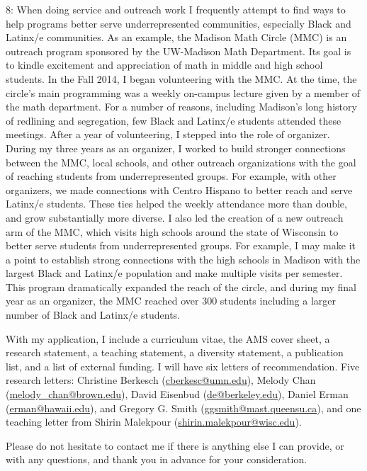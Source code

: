 \documentclass[11pt]{article}
\begin{document}
8: When doing service and outreach work I frequently attempt to find ways to help programs better serve underrepresented communities, especially Black and Latinx/e communities. As an example, the Madison Math Circle (MMC) is an outreach program sponsored by the UW-Madison Math Department. Its goal is to kindle excitement and appreciation of math in middle and high school students. In the Fall 2014, I began volunteering with the MMC. At the time, the circle's main programming was a weekly on-campus lecture given by a member of the math department. For a number of reasons, including Madison's long history of redlining and segregation, few Black and Latinx/e students attended these meetings. After a year of volunteering, I stepped into the role of organizer. During my three years as an organizer, I worked to build stronger connections between the MMC, local schools, and other outreach organizations with the goal of reaching students from underrepresented groups. For example, with other organizers, we made connections with Centro Hispano to better reach and serve Latinx/e students. These ties helped the weekly attendance more than double, and grow substantially more diverse. I also led the creation of a new outreach arm of the MMC, which visits high schools around the state of Wisconsin to better serve students from underrepresented groups. For example, I may make it a point to establish strong connections with the high schools in Madison with the largest Black and Latinx/e population and make multiple visits per semester. This program dramatically expanded the reach of the circle, and during my final year as an organizer, the MMC reached over 300 students including a larger number of Black and Latinx/e students.

With my application, I include a curriculum vitae, the AMS cover sheet, a research statement, a teaching statement, a diversity statement, a publication list, and a list of external funding. I will have six letters of recommendation. Five research letters: Christine Berkesch (\href{mailto:cberkesc@umn.edu}{cberkesc@umn.edu}), Melody Chan (\href{mailto:melody\_chan@brown.edu}{melody\_chan@brown.edu}), David Eisenbud  (\href{mailto:de@berkeley.edu
}{de@berkeley.edu}), Daniel Erman (\href{mailto:erman@hawaii.edu}{erman@hawaii.edu}), and Gregory G. Smith (\href{mailto:ggsmith@mast.queensu.ca}{ggsmith@mast.queensu.ca}), and one teaching letter from Shirin Malekpour (\href{mailto:shirin.malekpour@wisc.edu}{shirin.malekpour@wisc.edu}).  

Please do not hesitate to contact me if there is anything else I can provide, or with any questions, and thank you in advance for your consideration. 
\end{document}
